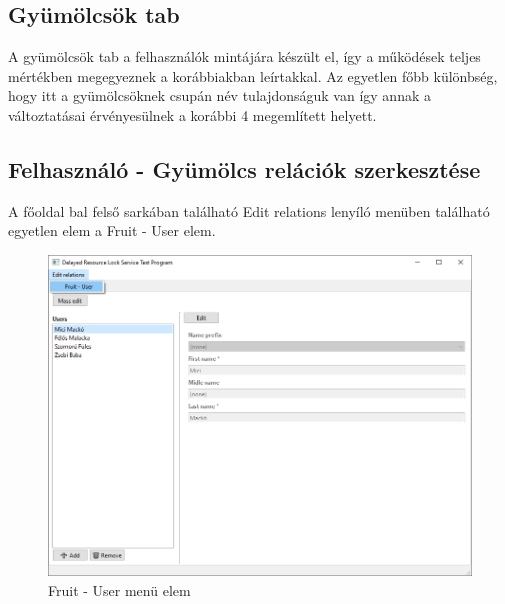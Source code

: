 \subsection{Gyümölcsök tab}

A gyümölcsök tab a felhasználók mintájára készült el, így a működések teljes mértékben megegyeznek a korábbiakban leírtakkal. Az egyetlen főbb különbség, hogy itt a gyümölcsöknek csupán név tulajdonságuk van így annak a változtatásai érvényesülnek a korábbi 4 megemlített helyett.

\subsection{Felhasználó - Gyümölcs relációk szerkesztése}

A főoldal bal felső sarkában található Edit relations lenyíló menüben található egyetlen elem a Fruit - User elem.

\begin{figure}[H]
	\centering
	\includegraphics[width=1\textwidth]{images/EditUser-Fruit.png}
	\caption{Fruit - User menü elem}
	\label{fig:main_window}
\end{figure}

